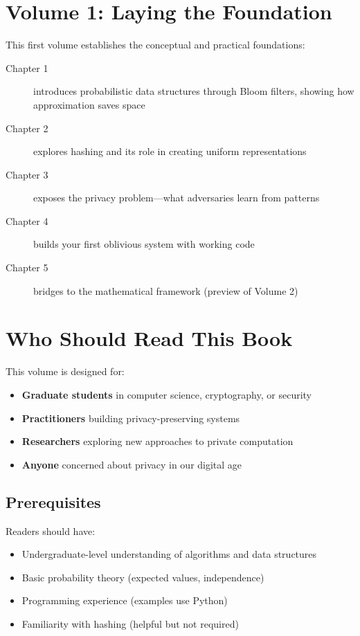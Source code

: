 \section*{Volume 1: Laying the Foundation}

This first volume establishes the conceptual and practical foundations:

\begin{description}
\item[Chapter 1] introduces probabilistic data structures through Bloom filters, showing how approximation saves space
\item[Chapter 2] explores hashing and its role in creating uniform representations
\item[Chapter 3] exposes the privacy problem—what adversaries learn from patterns
\item[Chapter 4] builds your first oblivious system with working code
\item[Chapter 5] bridges to the mathematical framework (preview of Volume 2)
\end{description}

\section*{Who Should Read This Book}

This volume is designed for:
\begin{itemize}
\item \textbf{Graduate students} in computer science, cryptography, or security
\item \textbf{Practitioners} building privacy-preserving systems
\item \textbf{Researchers} exploring new approaches to private computation
\item \textbf{Anyone} concerned about privacy in our digital age
\end{itemize}

\subsection*{Prerequisites}

Readers should have:
\begin{itemize}
\item Undergraduate-level understanding of algorithms and data structures
\item Basic probability theory (expected values, independence)
\item Programming experience (examples use Python)
\item Familiarity with hashing (helpful but not required)
\end{itemize}

